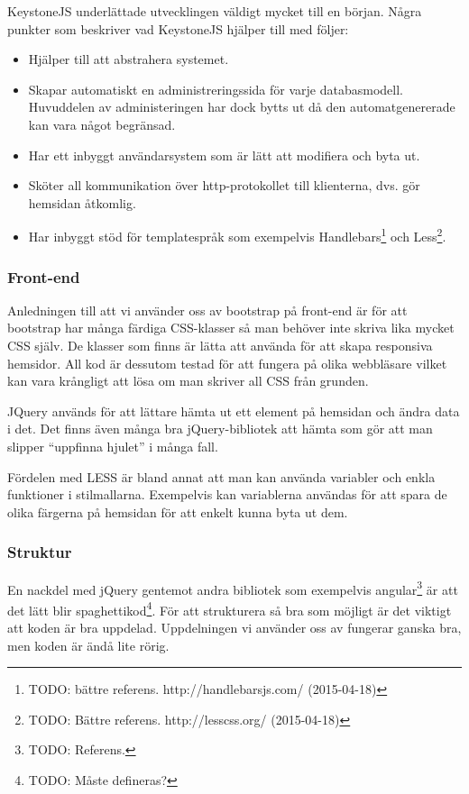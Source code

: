 \documentclass{article}
\begin{document}
KeystoneJS underlättade utvecklingen väldigt mycket till en början. Några punkter som beskriver vad KeystoneJS hjälper till med följer:

  \begin{itemize}
    \item Hjälper till att abstrahera systemet.
    \item Skapar automatiskt en administreringssida för varje databasmodell.
      Huvuddelen av administeringen har dock bytts ut då den automatgenererade kan vara något begränsad.
    \item Har ett inbyggt användarsystem som är lätt att modifiera och byta ut.
    \item Sköter all kommunikation över http-protokollet till klienterna, dvs. gör hemsidan åtkomlig.
    \item Har inbyggt stöd för templatespråk som exempelvis Handlebars\footnote{TODO: bättre referens. http://handlebarsjs.com/ (2015-04-18)} och Less\footnote{TODO: Bättre referens. http://lesscss.org/ (2015-04-18)}.
  \end{itemize}
  
\subsubsection{Front-end}
Anledningen till att vi använder oss av bootstrap på front-end är för att bootstrap har många färdiga CSS-klasser så man behöver inte skriva lika mycket CSS själv.
De klasser som finns är lätta att använda för att skapa responsiva hemsidor.
All kod är dessutom testad för att fungera på olika webbläsare vilket kan vara krångligt att lösa om man skriver all CSS från grunden.

JQuery används för att lättare hämta ut ett element på hemsidan och ändra data i det.
Det finns även många bra jQuery-bibliotek att hämta som gör att man slipper “uppfinna hjulet” i många fall.

Fördelen med LESS är bland annat att man kan använda variabler och enkla funktioner i stilmallarna.
Exempelvis kan variablerna användas för att spara de olika färgerna på hemsidan för att enkelt kunna byta ut dem.

\subsubsection{Struktur}
En nackdel med jQuery gentemot andra bibliotek som exempelvis angular\footnote{TODO: Referens.} är att det lätt blir spaghettikod\footnote{TODO: Måste defineras?}.
För att strukturera så bra som möjligt är det viktigt att koden är bra uppdelad.
Uppdelningen vi använder oss av fungerar ganska bra, men koden är ändå lite rörig.
\end{document}

